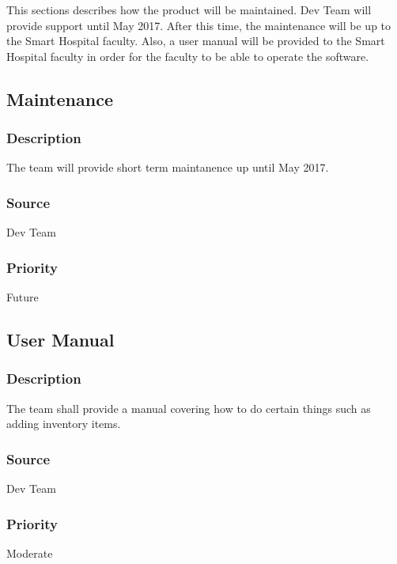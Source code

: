 This sections describes how the product will be maintained. Dev Team will provide support until May 2017. After this time, the maintenance will be up to the Smart Hospital faculty. Also, a user manual will be provided to the Smart Hospital faculty in order for the faculty to be able to operate the software.

\subsection{Maintenance}
\subsubsection{Description}
The team will provide short term maintanence up until May 2017.
\subsubsection{Source}
Dev Team
\subsubsection{Priority}
Future

\subsection{User Manual}
\subsubsection{Description}
The team shall provide a manual covering how to do certain things such as adding inventory items.
\subsubsection{Source}
Dev Team
\subsubsection{Priority}
Moderate